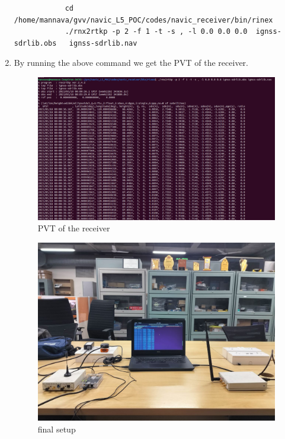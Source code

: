 \begin{enumerate}
\begin{lstlisting}
            cd /home/mannava/gvv/navic_L5_POC/codes/navic_receiver/bin/rinex
            ./rnx2rtkp -p 2 -f 1 -t -s , -l 0.0 0.0 0.0  ignss-sdrlib.obs   ignss-sdrlib.nav 
         \end{lstlisting}
         \item By running the above command we get the PVT of the receiver.
         \begin{normalsize}
            \begin{figure}[!ht]
                \centering
                \includegraphics[width=1\textwidth]{figs/pvt.png}
                \centering
                \captionsetup{justification=centering}
                \caption{PVT of the receiver}
                \end{figure}
            \end{normalsize}

            \begin{normalsize}
                \begin{figure}[!ht]
                    \centering
                    \includegraphics[width=1.2\textwidth]{figs/final.png}
                    \centering
                    \captionsetup{justification=centering}
                    \caption{final setup}
                    \end{figure}
                \end{normalsize}
\end{enumerate}




